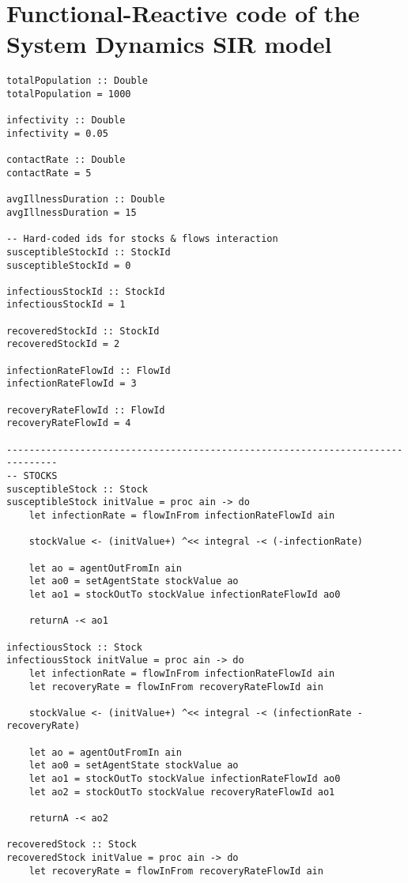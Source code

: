 \section{Functional-Reactive code of the System Dynamics SIR model}
\label{app:sd_code}

\begin{verbatim}
totalPopulation :: Double
totalPopulation = 1000

infectivity :: Double
infectivity = 0.05

contactRate :: Double
contactRate = 5

avgIllnessDuration :: Double
avgIllnessDuration = 15

-- Hard-coded ids for stocks & flows interaction
susceptibleStockId :: StockId
susceptibleStockId = 0

infectiousStockId :: StockId
infectiousStockId = 1

recoveredStockId :: StockId
recoveredStockId = 2

infectionRateFlowId :: FlowId
infectionRateFlowId = 3

recoveryRateFlowId :: FlowId
recoveryRateFlowId = 4

-------------------------------------------------------------------------------
-- STOCKS
susceptibleStock :: Stock
susceptibleStock initValue = proc ain -> do
    let infectionRate = flowInFrom infectionRateFlowId ain

    stockValue <- (initValue+) ^<< integral -< (-infectionRate)
    
    let ao = agentOutFromIn ain
    let ao0 = setAgentState stockValue ao
    let ao1 = stockOutTo stockValue infectionRateFlowId ao0

    returnA -< ao1

infectiousStock :: Stock
infectiousStock initValue = proc ain -> do
    let infectionRate = flowInFrom infectionRateFlowId ain
    let recoveryRate = flowInFrom recoveryRateFlowId ain

    stockValue <- (initValue+) ^<< integral -< (infectionRate - recoveryRate)
    
    let ao = agentOutFromIn ain
    let ao0 = setAgentState stockValue ao
    let ao1 = stockOutTo stockValue infectionRateFlowId ao0 
    let ao2 = stockOutTo stockValue recoveryRateFlowId ao1
    
    returnA -< ao2

recoveredStock :: Stock
recoveredStock initValue = proc ain -> do
    let recoveryRate = flowInFrom recoveryRateFlowId ain


\end{verbatim}
